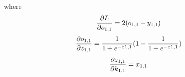 \documentclass[english,notitlepage,reprint]{revtex4-1}
\begin{document}
where
\begin{equation}\notag
  \frac{\partial L}{\partial o_{1,1}}=2(o_{1,1}-y_{1,1})
\end{equation}
\begin{equation}\notag
  \frac{\partial o_{1,1}}{\partial z_{1,1}}=\frac{1}{1+e^{-z{1,1}}}(1-\frac{1}{1+e^{-z{1,1}}})
\end{equation}
\begin{equation}\notag
  \frac{\partial z_{1,1}}{\partial k_{1,1}}=x_{1,1}
\end{equation}
\end{document}
